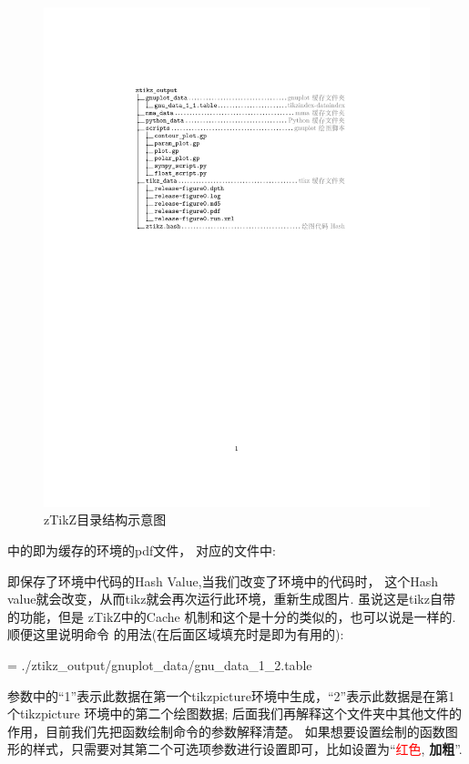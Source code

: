 \begin{figure}[!htb]
    \centering
    \includegraphics[width=.75\linewidth]{./pics/ztikz_tree.pdf}
    \caption{zTikZ目录结构示意图}
    \label{fig:zTikZ-directory}
\end{figure}

中的即为缓存的环境的pdf文件，
对应的文件中:

\begin{codeprint}
\def \tikzexternallastkey {AE7F2539E81C96848ADCCEE3994993D1}%
\end{codeprint}

即保存了环境中代码的Hash Value,当我们改变了环境中的代码时，
这个Hash value就会改变，从而tikz就会再次运行此环境，重新生成图片. 虽说这是tikz自带的功能，但是 
zTikZ中的Cache 机制和这个是十分的类似的，也可以说是一样的. 顺便这里说明命令\cmd{\gnudata}
的用法(在后面区域填充时是即为有用的):

\begin{codeprint}
 = ./ztikz_output/gnuplot_data/gnu_data_1_2.table
\end{codeprint}

\cmd{\gnudata}参数中的``1''表示此数据在第一个tikzpicture环境中生成，``2''表示此数据是在第1个tikzpicture
环境中的第二个绘图数据; 后面我们再解释这个文件夹中其他文件的作用，目前我们先把函数绘制命令\cmd{\Plot}的参数解释清楚。
如果想要设置绘制的函数图形的样式，只需要对其第二个可选项参数进行设置即可，比如设置为``\textcolor{red}{红色}, \textbf{加粗}''.

